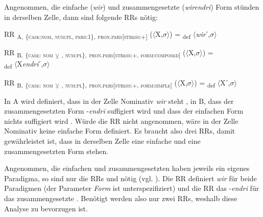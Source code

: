 Angenommen, die einfache (\textit{wir}) und zusammengesetzte (\textit{wirendri}) Form stünden in derselben Zelle, dann sind folgende RRs nötig:\largerpage[2]

\begin{exe}[(98)]
 RR \textsubscript{A,} \textsubscript{\{\textsc{case:nom}, \textsc{num:pl}, \textsc{pers:1}\},} \textsubscript{\textsc{pron.pers[stress:+]}} ($\langle$X,$\sigma$$\rangle$) = \textsubscript{def} $\langle$\textit{wir}ˊ,$\sigma$$\rangle$
\end{exe}

\begin{exe}[(106.1)]%
 \label{ex:key:106.1}
RR \textsubscript{B,} \textsubscript{\{\textsc{case:} \textsc{nom}} \textsubscript{\tiny $\veebar$}\textsubscript{ \AKK, \textsc{num:pl}\},} \textsubscript{\textsc{pron.pers[stress:+}, \textsc{form:composed]}} ($\langle$X,$\sigma$$\rangle$) = \\\textsubscript{def} $\langle$X\textit{endri}ˊ,$\sigma$$\rangle$
\end{exe}

\begin{exe}[(106.2)]%
 \label{ex:key:106.2}
RR \textsubscript{B,} \textsubscript{\{\textsc{case:} \textsc{nom}} \textsubscript{\tiny $\veebar$}\textsubscript{ \AKK, \textsc{num:pl}\},} \textsubscript{\textsc{pron.pers[stress:+}, \textsc{form:simple]}} ($\langle$X,$\sigma$$\rangle$) = \textsubscript{def} $\langle$Xˊ,$\sigma$$\rangle$
\end{exe}

In  A wird definiert, dass in der Zelle Nominativ \textit{wir} steht , in  B, dass der zusammengesetzten Form -\textit{endri} suffigiert wird  und dass der einfachen Form nichts suffigiert wird . Würde die RR  nicht angenommen, wäre in der Zelle Nominativ keine einfache Form definiert. Es braucht also drei RRs, damit gewährleistet ist, dass in derselben Zelle eine einfache und eine zusammengesetzten Form stehen.

Angenommen, die einfachen und zusammengesetzten  haben jeweils ein eigenes Paradigma, so sind nur die RRs  und  nötig (vgl. ). Die RR  definiert \textit{wir} für beide Paradigmen (der Parameter \textit{Form} ist unterspezifiziert) und die RR  das  -\textit{endri} für das zusammengesetzte . Benötigt werden also nur zwei RRs, weshalb diese Analyse zu bevorzugen ist.


